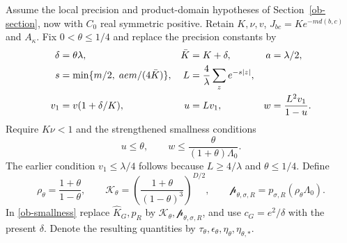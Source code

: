 Assume the local precision and product-domain hypotheses of
Section~\ref{ob-section}, now with $C_0$ real symmetric positive.
Retain $K,\nu,v$, $J_{bc}=Ke^{-md(b,c)}$ and $A_\kappa$.
Fix $0<\theta\le1/4$ and replace the precision constants by
\begin{align}
 \delta&=\theta\lambda,& \bar K&=K+\delta,& a&=\lambda/2,
 \notag\\
 s&=\min\{m/2,\;aem/(4\bar K)\},&
 L&=\frac4\lambda\sum_z e^{-s|z|},\notag\\
 v_1&=v(1+\delta/K),&
 u&=Lv_1,& w&=\frac{L^2v_1}{1-u}.                \label{otg-precision-constants}
\end{align}
Require $K\nu<1$ and the strengthened smallness conditions
\begin{equation}\label{otg-precision-small}
 u\le\theta,\qquad
 w\le\frac{\theta}{(1+\theta)\Lambda_0}.
\end{equation}
The earlier condition $v_1\le\lambda/4$ follows because
$L\ge4/\lambda$ and $\theta\le1/4$.
Define
\begin{equation}\label{otg-strict-density-constants}
 \rho_\theta=\frac{1+\theta}{1-\theta},\qquad
 \mathcal K_\theta=
     \left(\frac{1+\theta}{(1-\theta)^3}\right)^{D/2},
 \qquad
 \mathcal p_{\theta,\sigma,R}
        =p_{\sigma,R}(\rho_\theta\Lambda_0).
\end{equation}
In \eqref{ob-smallness} replace
$\widehat K_G,\widehat p_R$ by
$\mathcal K_\theta,\mathcal p_{\theta,\sigma,R}$,
and use $c_G=e^2/\delta$ with the present $\delta$.
Denote the resulting quantities by
$\mathcal\tau_\theta,\mathcal\epsilon_\theta,
\mathcal\eta_\theta,\mathcal\eta_{\theta,*}$.

